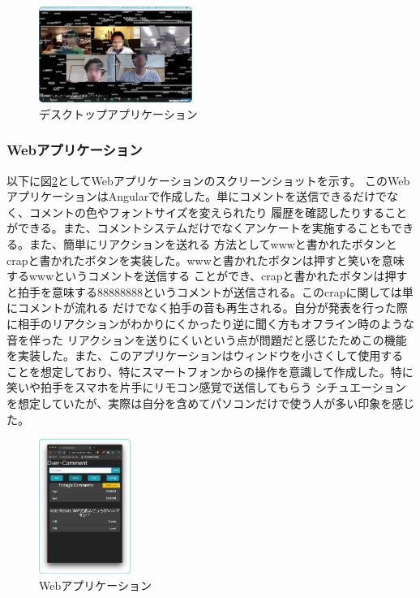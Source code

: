 \documentclass[a4j,twocolumn]{ujarticle}
\begin{document}
\begin{figure}[h]
\centering
\includegraphics[width=5cm]{../assets/dsk-app.jpg}
\caption{デスクトップアプリケーション}
\label{dsk-app}
\end{figure}

\subsubsection{Webアプリケーション}
以下に図\ref{web-app}としてWebアプリケーションのスクリーンショットを示す。
このWebアプリケーションはAngularで作成した。単にコメントを送信できるだけでなく、コメントの色やフォントサイズを変えられたり
履歴を確認したりすることができる。また、コメントシステムだけでなくアンケートを実施することもできる。また、簡単にリアクションを送れる
方法としてwwwと書かれたボタンとcrapと書かれたボタンを実装した。wwwと書かれたボタンは押すと笑いを意味するwwwというコメントを送信する
ことができ、crapと書かれたボタンは押すと拍手を意味する88888888というコメントが送信される。このcrapに関しては単にコメントが流れる
だけでなく拍手の音も再生される。自分が発表を行った際に相手のリアクションがわかりにくかったり逆に聞く方もオフライン時のような音を伴った
リアクションを送りにくいという点が問題だと感じたためこの機能を実装した。また、このアプリケーションはウィンドウを小さくして使用する
ことを想定しており、特にスマートフォンからの操作を意識して作成した。特に笑いや拍手をスマホを片手にリモコン感覚で送信してもらう
シチュエーションを想定していたが、実際は自分を含めてパソコンだけで使う人が多い印象を感じた。

\begin{figure}[h]
\centering
\includegraphics[width=3cm]{../assets/web-app.jpg}
\caption{Webアプリケーション}
\label{web-app}
\end{figure}
\end{document}
